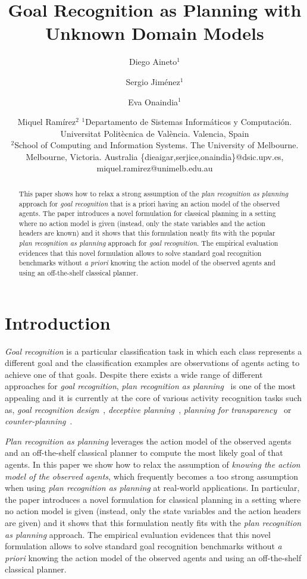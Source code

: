 \documentclass{article}
\title{Goal Recognition as Planning with Unknown Domain Models}
\author{
Diego Aineto$^1$\and
Sergio Jim\'enez$^1$\and
Eva Onaindia$^1$\And
\and
Miquel Ram\'irez$^2$
\affiliations
$^1${\small Departamento de Sistemas Inform\'aticos y Computaci\'on. Universitat Polit\`ecnica de Val\`encia. Valencia, Spain}\\
$^2${\small School of Computing and Information Systems. The University of Melbourne. Melbourne, Victoria. Australia}
\emails
{\scriptsize \{dieaigar,serjice,onaindia\}@dsic.upv.es, miquel.ramirez@unimelb.edu.au}}
\begin{document}
\maketitle

\begin{abstract}
This paper shows how to relax a strong assumption of the {\em plan recognition as planning} approach for {\em goal recognition} that is a priori having an action model of the observed agents. The paper introduces a novel formulation for classical planning in a setting where no action model is given (instead, only the state variables and the action headers are known) and it shows that this formulation neatly fits with the popular {\em plan recognition as planning} approach for {\em goal recognition}. The empirical evaluation evidences that this novel formulation allows to solve standard goal recognition benchmarks without {\em a priori} knowing the action model of the observed agents and using an off-the-shelf classical planner.  
\end{abstract}

\section{Introduction}
\label{sec:introduction}
{\em Goal recognition} is a particular classification task in which each class represents a different goal and the classification examples are observations of agents acting to achieve one of that goals. Despite there exists a wide range of different approaches for {\em goal recognition}, {\em plan recognition as planning}~\cite{ramirez2009plan,ramirez2012plan} is one of the most appealing and it is currently at the core of various activity recognition tasks such as, {\em goal recognition design}~\cite{KerenGK14}, {\em deceptive planning}~\cite{masters2017deceptive}, {\em planning for transparency}~\cite{macnally2018action} or {\em counter-planning}~\cite{PozancoEFB18}.

{\em Plan recognition as planning} leverages the action model of the observed agents and an off-the-shelf classical planner to compute the most likely goal of that agents. In this paper we show how to relax the assumption of {\em knowing the action model of the observed agents}, which frequently becomes a too strong assumption when using {\em plan recognition as planning} at real-world applications.  In particular, the paper introduces a novel formulation for classical planning in a setting where no action model is given (instead, only the state variables and the action headers are given) and it shows that this formulation neatly fits with the {\em plan recognition as planning} approach. The empirical evaluation evidences that this novel formulation allows to solve standard goal recognition benchmarks without {\em a priori} knowing the action model of the observed agents and using an off-the-shelf classical planner.  
\end{document}

